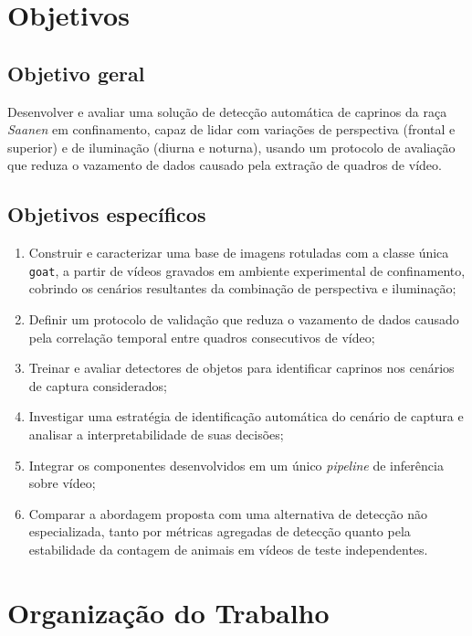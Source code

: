 \section{Objetivos}
\label{sec:objetivos}

\subsection*{Objetivo geral}

Desenvolver e avaliar uma solução de detecção automática de caprinos da raça \textit{Saanen} em confinamento, capaz de lidar com variações de perspectiva (frontal e superior) e de iluminação (diurna e noturna), usando um protocolo de avaliação que reduza o vazamento de dados causado pela extração de quadros de vídeo.

\subsection*{Objetivos específicos}

\begin{enumerate}
    \renewcommand{\labelenumi}{\roman{enumi}.}
    \item Construir e caracterizar uma base de imagens rotuladas com a classe única \texttt{goat}, a partir de vídeos gravados em ambiente experimental de confinamento, cobrindo os cenários resultantes da combinação de perspectiva e iluminação;
    \item Definir um protocolo de validação que reduza o vazamento de dados causado pela correlação temporal entre quadros consecutivos de vídeo;
    \item Treinar e avaliar detectores de objetos para identificar caprinos nos cenários de captura considerados;
    \item Investigar uma estratégia de identificação automática do cenário de captura e analisar a interpretabilidade de suas decisões;
    \item Integrar os componentes desenvolvidos em um único \textit{pipeline} de inferência sobre vídeo;
    \item Comparar a abordagem proposta com uma alternativa de detecção não especializada, tanto por métricas agregadas de detecção quanto pela estabilidade da contagem de animais em vídeos de teste independentes.
\end{enumerate}

\section{Organização do Trabalho}
\label{sec:organizacao}

